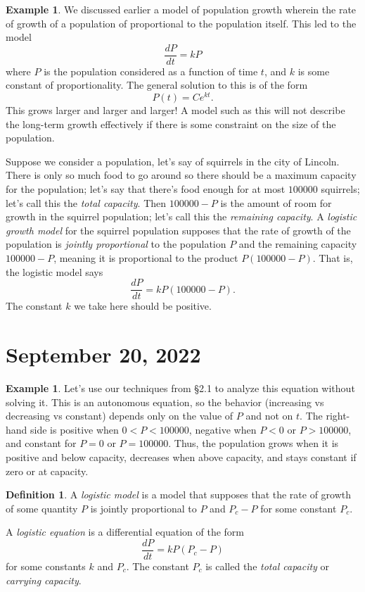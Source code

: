 \documentclass[12pt]{amsart}
\numberwithin{equation}{section}
\theoremstyle{plain} %
\newcommand{\Sept}[1]{\section{September #1, 2022}}
\theoremstyle{definition}
\newtheorem{defn}[equation]{Definition}
\newtheorem{ex}[equation]{Example}
\theoremstyle{remark}
\begin{document}
\begin{ex} We discussed earlier a model of population growth wherein the rate of growth of a population of proportional to the population itself. This led to the model
\[ \frac{dP}{dt} = k P\]
where $P$ is the population considered as a function of time $t$, and $k$ is some constant of proportionality. The general solution to this is of the form
\[ P(t) = C e^{kt}.\]
This grows larger and larger and larger! A model such as this will not describe the long-term growth effectively if there is some constraint on the size of the population.

Suppose we consider a population, let's say of squirrels in the city of Lincoln. There is only so much food to go around so there should be a maximum capacity for the population; let's say that there's food enough for at most $100000$ squirrels; let's call this the \emph{total capacity}. Then $100000-P$ is the amount of room for growth in the squirrel population; let's call this the \emph{remaining capacity}. A \emph{logistic growth model} for the squirrel population supposes that the rate of growth of the population is \emph{jointly proportional} to the population $P$ and the remaining capacity $100000-P$, meaning it is proportional to the product $P (100000-P)$. That is, the logistic model says
\[ \frac{dP}{dt} = k  P (100000-P).\]
The constant $k$ we take here should be positive.
\end{ex}

\Sept{20}

 \begin{ex}
Let's use our techniques from \S2.1 to analyze this equation without solving it. This is an autonomous equation, so the behavior (increasing vs decreasing vs constant) depends only on the value of $P$ and not on $t$. The right-hand side is positive when $0<P<100000$, negative when $P<0$ or $P>100000$, and constant for $P=0$ or $P=100000$. Thus, the population grows when it is positive and below capacity, decreases when above capacity, and stays constant if zero or at capacity.
\end{ex}

\begin{defn}
A \emph{logistic model} is a model that supposes that the rate of growth of some quantity $P$ is jointly proportional to $P$ and $P_c - P$ for some constant $P_c$.

A \emph{logistic equation} is a differential equation of the form
\[ \frac{dP}{dt} = k P (P_{c} - P)\]
for some constants $k$ and $P_c$. The constant $P_c$ is called the \emph{total capacity} or \emph{carrying capacity}.
\end{defn}
\end{document}
